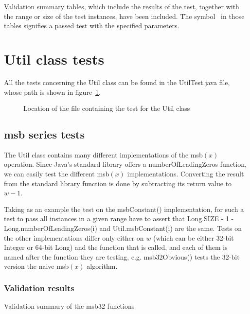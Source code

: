 Validation summary tables, which include the results of the test, together with the range or size of the test instances, have been included.
The symbol \checkmark \ in those tables signifies a passed test with the specified parameters.

\section{{\ttfamily Util} class tests}

All the tests concerning the {\ttfamily Util} class can be found in the {\ttfamily UtilTest.java} file, whose path is shown in figure~\ref{fig:utilTestTree}.

\begin{figure}[H]
    \caption{Location of the file containing the test for the {\ttfamily Util} class}
    \label{fig:utilTestTree}
\end{figure}

\subsection{msb series tests}

The {\ttfamily Util} class contains many different implementations of the msb$(x)$ operation. Since Java's standard library offers a {\ttfamily numberOfLeadingZeros} function, we can easily test the different msb$(x)$ implementations. Converting the result from the standard library function is done by subtracting its return value to $w - 1$.

Taking as an example the test on the {\ttfamily msbConstant()} implementation, for such a test to pass all instances in a given range have to assert that {\ttfamily Long.SIZE - 1 - Long.numberOfLeadingZeros(i)} and {\ttfamily Util.msbConstant(i)} are the same. Tests on the other implementations differ only either on $w$ (which can be either 32-bit {\ttfamily Integer} or 64-bit {\ttfamily Long}) and the function that is called, and each of them is named after the function they are testing, e.g. {\ttfamily msb32Obvious()} tests the 32-bit version the naive msb$(x)$ algorithm.

\subsubsection{Validation results}

\begin{table}[H]
\centering

\caption{Validation summary of the {\ttfamily msb32} functions}
\label{tab:msb32Validation}
\end{table}

